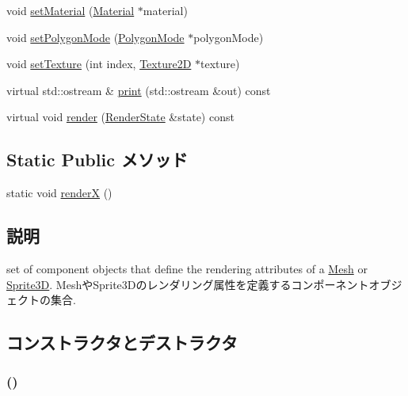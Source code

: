 \begin{CompactItemize}
\item 
void \hyperlink{classm3g_1_1Appearance_1dfd1a55fa3cc625719dab8e95c8a2de}{setMaterial} (\hyperlink{classm3g_1_1Material}{Material} $\ast$material)
\item 
void \hyperlink{classm3g_1_1Appearance_cc21fac7868e2ad37e689ac642db1aae}{setPolygonMode} (\hyperlink{classm3g_1_1PolygonMode}{PolygonMode} $\ast$polygonMode)
\item 
void \hyperlink{classm3g_1_1Appearance_493e54b1c7ab839b9e76b28e0629cf6a}{setTexture} (int index, \hyperlink{classm3g_1_1Texture2D}{Texture2D} $\ast$texture)
\item 
virtual std::ostream \& \hyperlink{classm3g_1_1Appearance_6fea17fa1532df3794f8cb39cb4f911f}{print} (std::ostream \&out) const 
\item 
virtual void \hyperlink{classm3g_1_1Appearance_8babc8a79b78615da51161e94029eea9}{render} (\hyperlink{structm3g_1_1RenderState}{RenderState} \&state) const 
\end{CompactItemize}
\subsection*{Static Public メソッド}
\begin{CompactItemize}
\item 
static void \hyperlink{classm3g_1_1Appearance_443a7a301f77f625335ecc06d13bad06}{renderX} ()
\end{CompactItemize}


\subsection{説明}
set of component objects that define the rendering attributes of a \hyperlink{classm3g_1_1Mesh}{Mesh} or \hyperlink{classm3g_1_1Sprite3D}{Sprite3D}. MeshやSprite3Dのレンダリング属性を定義するコンポーネントオブジェクトの集合. 

\subsection{コンストラクタとデストラクタ}
\hypertarget{classm3g_1_1Appearance_2e594c7b96cb5cfad839a98b57f5d42f}{
\subsubsection[{Appearance}]{ ()}}
\label{classm3g_1_1Appearance_2e594c7b96cb5cfad839a98b57f5d42f}


